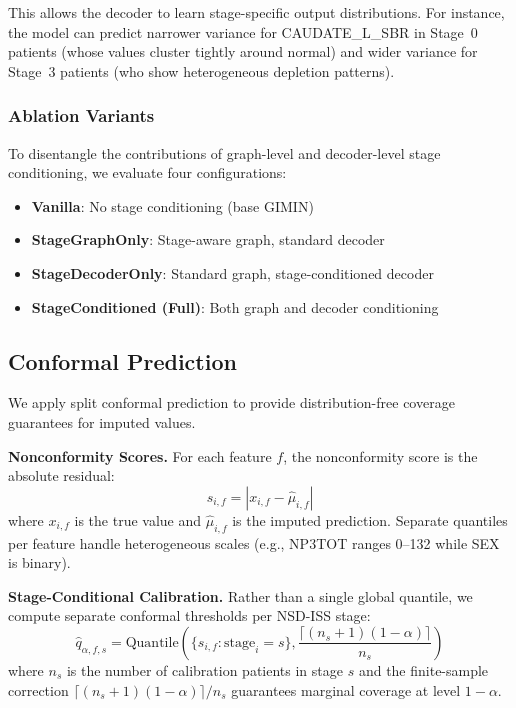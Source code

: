This allows the decoder to learn stage-specific output distributions. For instance, the model can predict narrower variance for CAUDATE\_L\_SBR in Stage~0 patients (whose values cluster tightly around normal) and wider variance for Stage~3 patients (who show heterogeneous depletion patterns).

\subsubsection{Ablation Variants}
To disentangle the contributions of graph-level and decoder-level stage conditioning, we evaluate four configurations:
\begin{itemize}
    \item \textbf{Vanilla}: No stage conditioning (base GIMIN)
    \item \textbf{StageGraphOnly}: Stage-aware graph, standard decoder
    \item \textbf{StageDecoderOnly}: Standard graph, stage-conditioned decoder
    \item \textbf{StageConditioned (Full)}: Both graph and decoder conditioning
\end{itemize}

\subsection{Conformal Prediction}
\label{p2:sec:conformal}

We apply split conformal prediction to provide distribution-free coverage guarantees for imputed values.

\textbf{Nonconformity Scores.} For each feature $f$, the nonconformity score is the absolute residual:
\begin{equation}
s_{i,f} = |x_{i,f} - \hat{\mu}_{i,f}|
\label{p2:eq:nonconf}
\end{equation}
where $x_{i,f}$ is the true value and $\hat{\mu}_{i,f}$ is the imputed prediction. Separate quantiles per feature handle heterogeneous scales (e.g., NP3TOT ranges 0--132 while SEX is binary).

\textbf{Stage-Conditional Calibration.} Rather than a single global quantile, we compute separate conformal thresholds per NSD-ISS stage:
\begin{equation}
\hat{q}_{\alpha,f,s} = \text{Quantile}\left(\{s_{i,f} : \text{stage}_i = s\}, \frac{\lceil(n_s+1)(1-\alpha)\rceil}{n_s}\right)
\label{p2:eq:stage_quantile}
\end{equation}
where $n_s$ is the number of calibration patients in stage $s$ and the finite-sample correction $\lceil(n_s+1)(1-\alpha)\rceil / n_s$ guarantees marginal coverage at level $1-\alpha$.

